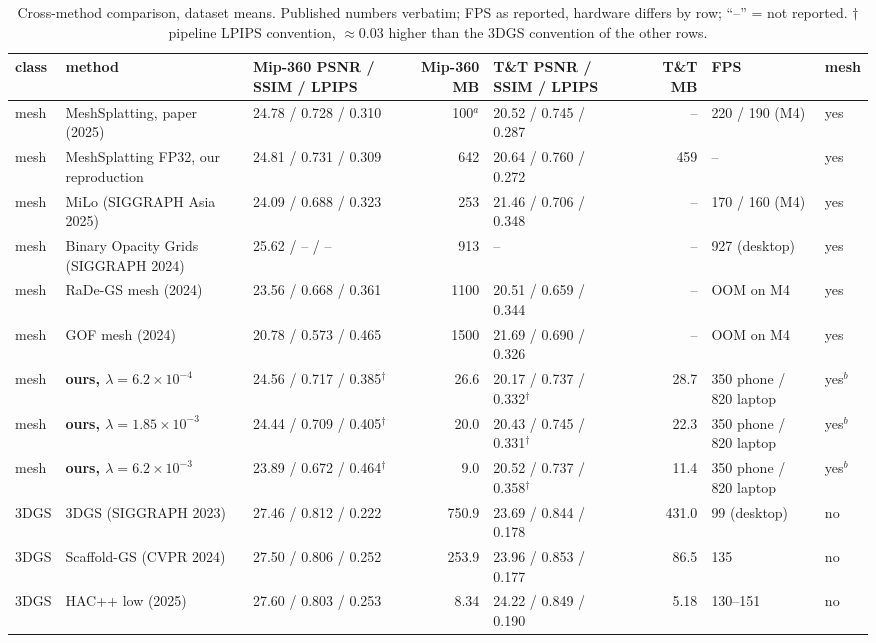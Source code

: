\documentclass[11pt,a4paper]{article}
\begin{document}
\begin{table}
\centering\scriptsize
\caption{Cross-method comparison, dataset means. Published numbers verbatim; FPS as reported, hardware differs by row; ``--'' = not reported. $\dagger$ pipeline LPIPS convention, $\approx 0.03$ higher than the 3DGS convention of the other rows.}
\label{tab:cross}
\setlength{\tabcolsep}{3.5pt}
\begin{tabular}{@{}llllrllrll@{}}
\toprule
class & method & Mip-360 PSNR / SSIM / LPIPS & & Mip-360 MB & T\&T PSNR / SSIM / LPIPS & & T\&T MB & FPS & mesh \\
\midrule
mesh & MeshSplatting, paper (2025) & 24.78 / 0.728 / 0.310 & & 100$^{a}$ & 20.52 / 0.745 / 0.287 & & -- & 220 / 190 (M4) & yes \\
mesh & MeshSplatting FP32, our reproduction & 24.81 / 0.731 / 0.309 & & 642 & 20.64 / 0.760 / 0.272 & & 459 & -- & yes \\
mesh & MiLo (SIGGRAPH Asia 2025) & 24.09 / 0.688 / 0.323 & & 253 & 21.46 / 0.706 / 0.348 & & -- & 170 / 160 (M4) & yes \\
mesh & Binary Opacity Grids (SIGGRAPH 2024) & 25.62 / -- / -- & & 913 & -- & & -- & 927 (desktop) & yes \\
mesh & RaDe-GS mesh (2024) & 23.56 / 0.668 / 0.361 & & 1100 & 20.51 / 0.659 / 0.344 & & -- & OOM on M4 & yes \\
mesh & GOF mesh (2024) & 20.78 / 0.573 / 0.465 & & 1500 & 21.69 / 0.690 / 0.326 & & -- & OOM on M4 & yes \\
mesh & \textbf{ours, $\lambda = 6.2\times10^{-4}$} & 24.56 / 0.717 / 0.385$^\dagger$ & & 26.6 & 20.17 / 0.737 / 0.332$^\dagger$ & & 28.7 & 350 phone / 820 laptop & yes$^{b}$ \\
mesh & \textbf{ours, $\lambda = 1.85\times10^{-3}$} & 24.44 / 0.709 / 0.405$^\dagger$ & & 20.0 & 20.43 / 0.745 / 0.331$^\dagger$ & & 22.3 & 350 phone / 820 laptop & yes$^{b}$ \\
mesh & \textbf{ours, $\lambda = 6.2\times10^{-3}$} & 23.89 / 0.672 / 0.464$^\dagger$ & & 9.0 & 20.52 / 0.737 / 0.358$^\dagger$ & & 11.4 & 350 phone / 820 laptop & yes$^{b}$ \\
\midrule
3DGS & 3DGS (SIGGRAPH 2023) & 27.46 / 0.812 / 0.222 & & 750.9 & 23.69 / 0.844 / 0.178 & & 431.0 & 99 (desktop) & no \\
3DGS & Scaffold-GS (CVPR 2024) & 27.50 / 0.806 / 0.252 & & 253.9 & 23.96 / 0.853 / 0.177 & & 86.5 & 135 & no \\
3DGS & HAC++ low (2025) & 27.60 / 0.803 / 0.253 & & 8.34 & 24.22 / 0.849 / 0.190 & & 5.18 & 130--151 & no \\

\end{tabular}
\end{table}
\end{document}
